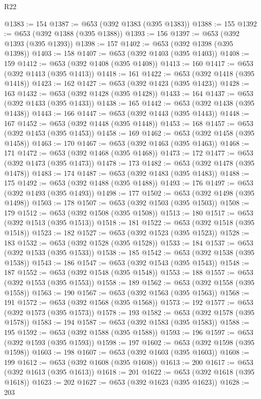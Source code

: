 \begin{lexlean}{R22}
\begin{coremodule}
@1383 := 154
@1387 := @653 (@392 @1383 (@395 @1383))
@1388 := 155
@1392 := @653 (@392 @1388 (@395 @1388))
@1393 := 156
@1397 := @653 (@392 @1393 (@395 @1393))
@1398 := 157
@1402 := @653 (@392 @1398 (@395 @1398))
@1403 := 158
@1407 := @653 (@392 @1403 (@395 @1403))
@1408 := 159
@1412 := @653 (@392 @1408 (@395 @1408))
@1413 := 160
@1417 := @653 (@392 @1413 (@395 @1413))
@1418 := 161
@1422 := @653 (@392 @1418 (@395 @1418))
@1423 := 162
@1427 := @653 (@392 @1423 (@395 @1423))
@1428 := 163
@1432 := @653 (@392 @1428 (@395 @1428))
@1433 := 164
@1437 := @653 (@392 @1433 (@395 @1433))
@1438 := 165
@1442 := @653 (@392 @1438 (@395 @1438))
@1443 := 166
@1447 := @653 (@392 @1443 (@395 @1443))
@1448 := 167
@1452 := @653 (@392 @1448 (@395 @1448))
@1453 := 168
@1457 := @653 (@392 @1453 (@395 @1453))
@1458 := 169
@1462 := @653 (@392 @1458 (@395 @1458))
@1463 := 170
@1467 := @653 (@392 @1463 (@395 @1463))
@1468 := 171
@1472 := @653 (@392 @1468 (@395 @1468))
@1473 := 172
@1477 := @653 (@392 @1473 (@395 @1473))
@1478 := 173
@1482 := @653 (@392 @1478 (@395 @1478))
@1483 := 174
@1487 := @653 (@392 @1483 (@395 @1483))
@1488 := 175
@1492 := @653 (@392 @1488 (@395 @1488))
@1493 := 176
@1497 := @653 (@392 @1493 (@395 @1493))
@1498 := 177
@1502 := @653 (@392 @1498 (@395 @1498))
@1503 := 178
@1507 := @653 (@392 @1503 (@395 @1503))
@1508 := 179
@1512 := @653 (@392 @1508 (@395 @1508))
@1513 := 180
@1517 := @653 (@392 @1513 (@395 @1513))
@1518 := 181
@1522 := @653 (@392 @1518 (@395 @1518))
@1523 := 182
@1527 := @653 (@392 @1523 (@395 @1523))
@1528 := 183
@1532 := @653 (@392 @1528 (@395 @1528))
@1533 := 184
@1537 := @653 (@392 @1533 (@395 @1533))
@1538 := 185
@1542 := @653 (@392 @1538 (@395 @1538))
@1543 := 186
@1547 := @653 (@392 @1543 (@395 @1543))
@1548 := 187
@1552 := @653 (@392 @1548 (@395 @1548))
@1553 := 188
@1557 := @653 (@392 @1553 (@395 @1553))
@1558 := 189
@1562 := @653 (@392 @1558 (@395 @1558))
@1563 := 190
@1567 := @653 (@392 @1563 (@395 @1563))
@1568 := 191
@1572 := @653 (@392 @1568 (@395 @1568))
@1573 := 192
@1577 := @653 (@392 @1573 (@395 @1573))
@1578 := 193
@1582 := @653 (@392 @1578 (@395 @1578))
@1583 := 194
@1587 := @653 (@392 @1583 (@395 @1583))
@1588 := 195
@1592 := @653 (@392 @1588 (@395 @1588))
@1593 := 196
@1597 := @653 (@392 @1593 (@395 @1593))
@1598 := 197
@1602 := @653 (@392 @1598 (@395 @1598))
@1603 := 198
@1607 := @653 (@392 @1603 (@395 @1603))
@1608 := 199
@1612 := @653 (@392 @1608 (@395 @1608))
@1613 := 200
@1617 := @653 (@392 @1613 (@395 @1613))
@1618 := 201
@1622 := @653 (@392 @1618 (@395 @1618))
@1623 := 202
@1627 := @653 (@392 @1623 (@395 @1623))
@1628 := 203

\end{coremodule}
\end{lexlean}
